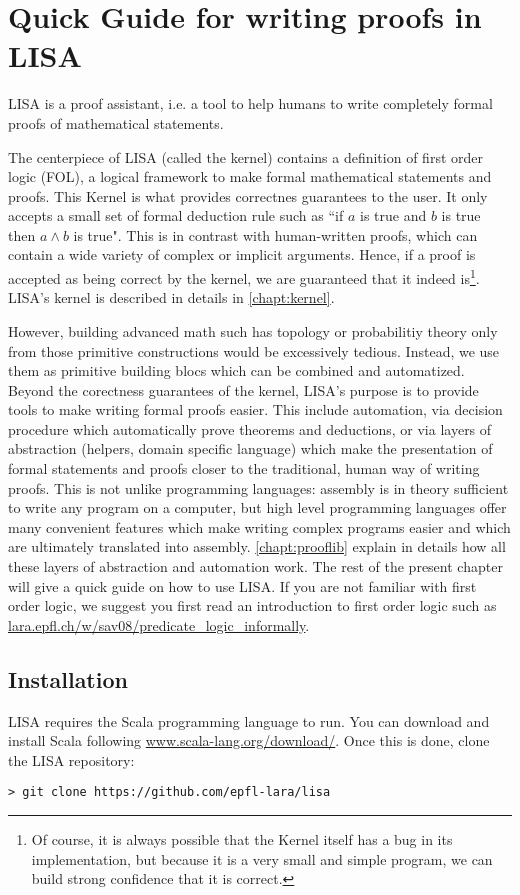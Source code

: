 \chapter{Quick Guide for writing proofs in LISA}
\label{chapt:quickguide}
LISA is a proof assistant, i.e. a tool to help humans to write completely formal proofs of mathematical statements. 

The centerpiece of LISA (called the kernel) contains a definition of first order logic (FOL), a logical framework to make formal mathematical statements and proofs. This Kernel is what provides correctnes guarantees to the user. It only accepts a small set of formal deduction rule such as ``if $a$ is true and $b$ is true then $a\land b$ is true". 
This is in contrast with human-written proofs, which can contain a wide variety of complex or implicit arguments. Hence, if a proof is accepted as being correct by the kernel, we are guaranteed that it indeed is\footnote{Of course, it is always possible that the Kernel itself has a bug in its implementation, but because it is a very small and simple program, we can build strong confidence that it is correct.}.
LISA's kernel is described in details in \autoref{chapt:kernel}.

However, building advanced math such has topology or probabilitiy theory only from those primitive constructions would be excessively tedious. Instead, we use them as primitive building blocs which can be combined and automatized. Beyond the corectness guarantees of the kernel, LISA's purpose is to provide tools to make writing formal proofs easier. This include automation, via decision procedure which automatically prove theorems and deductions, or via layers of abstraction (helpers, domain specific language) which make the presentation of formal statements and proofs closer to the traditional, human way of writing proofs. 
This is not unlike programming languages: assembly is in theory sufficient to write any program on a computer, but high level programming languages offer many convenient features which make writing complex programs easier and which are ultimately translated into assembly. 
\autoref{chapt:prooflib} explain in details how all these layers of abstraction and automation work. The rest of the present chapter will give a quick guide on how to use LISA. If you are not familiar with first order logic, we suggest you first read an introduction to first order logic such as \url{lara.epfl.ch/w/sav08/predicate_logic_informally}.

\section{Installation}
LISA requires the Scala programming language to run. You can download and install Scala following \url{www.scala-lang.org/download/}. Once this is done, clone the LISA repository:
\begin{lstlisting}[language=console]
> git clone https://github.com/epfl-lara/lisa
\end{lstlisting}


